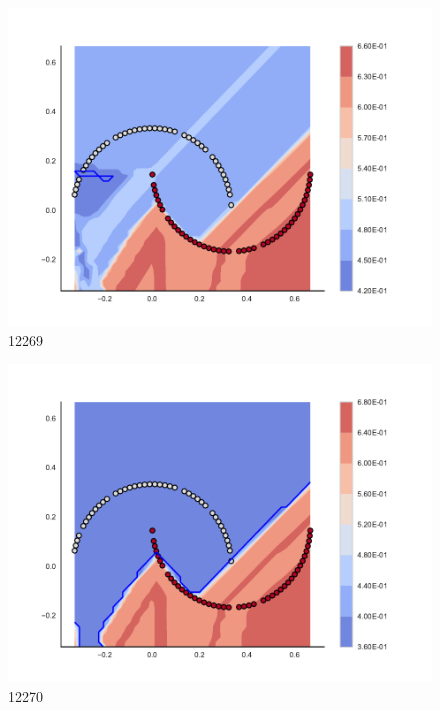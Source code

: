 \begin{subfigure}[b]{0.09\textwidth}
    \includegraphics[clip, trim=2.35cm 1.75cm 4.5cm 0cm,width=\textwidth]{img/convergence/12269.pdf}
    \caption{12269}
    \label{fig:convergence_12269}
\end{subfigure}
%
\begin{subfigure}[b]{0.09\textwidth}
    \includegraphics[clip, trim=2.35cm 1.75cm 4.5cm 0cm,width=\textwidth]{img/convergence/12270.pdf}
    \caption{12270}
    \label{fig:convergence_12270}
\end{subfigure}
%
